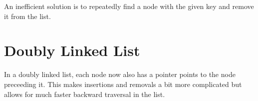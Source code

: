 \documentclass{article}
\begin{document}
An inefficient solution is to repeatedly find a node with the given key and remove it from the list.



\section{Doubly Linked List}

In a doubly linked list, each node now also has a pointer points to the node preceeding it. This makes insertions and removals a bit more complicated but allows for much faster backward traversal in the list.
\end{document}
